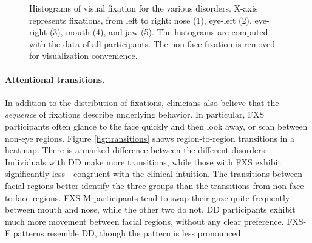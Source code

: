 \documentclass{llncs}
\begin{document}
  \begin{figure}[h]
    \hfill
    \hfill
    \vspace{-1 em}
    \caption{Histograms of visual fixation for the various disorders. X-axis represents fixations, from left to right: nose (1), eye-left (2), eye-right (3), mouth (4), and jaw (5). The histograms are computed with the data of all participants. The non-face fixation is removed for visualization convenience. }
    \label{fig:histo}
   \vspace*{-\baselineskip}
  \end{figure}

  \paragraph{Attentional transitions.} In addition to the distribution of fixations, clinicians also believe that the \emph{sequence} of fixations describe underlying behavior. In particular, FXS participants often glance to the face quickly and then look away, or scan between non-eye regions. Figure \ref{fig:transitions} shows region-to-region transitions in a heatmap. There is a marked difference between the different disorders: Individuals with DD make more transitions, while those with FXS exhibit significantly less---congruent with the clinical intuition. The transitions between facial regions better identify the three groups than the transitions from non-face to face regions. FXS-M participants tend to swap their gaze quite frequently between mouth and nose, while the other two do not. DD participants exhibit much more movement between facial regions, without any clear preference. FXS-F patterns resemble DD, though the pattern is less pronounced.
  
\end{document}
